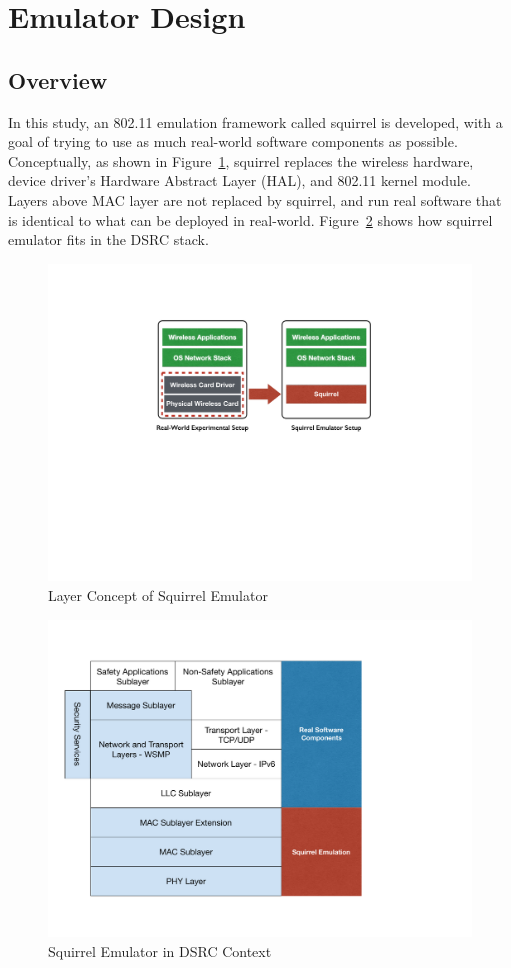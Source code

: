 \documentclass[12pt]{report}
\begin{document}
\section{Emulator Design}
\subsection{Overview}

In this study, an 802.11 emulation framework called squirrel is developed, with a goal of trying to use as much real-world software components as possible. Conceptually, as shown in Figure~\ref{fig:squirrel_concept}, squirrel replaces the wireless hardware, device driver's Hardware Abstract Layer (HAL), and 802.11 kernel module. Layers above MAC layer are not replaced by squirrel, and run real software that is identical to what can be deployed in real-world. Figure~\ref{fig:squirrel_dsrc} shows how squirrel emulator fits in the DSRC stack.

\begin{figure}[h]
  \begin{center}
    \includegraphics[width=.7\textwidth]{figures/squirrelConcept.pdf}
    \caption{\label{fig:squirrel_concept}Layer Concept of Squirrel Emulator}
  \end{center}
\end{figure}

\begin{figure}[h]
  \begin{center}
    \includegraphics[width=.7\textwidth]{figures/squirrelDSRC.pdf}
    \caption{\label{fig:squirrel_dsrc}Squirrel Emulator in DSRC Context}
  \end{center}
\end{figure}
\end{document}
